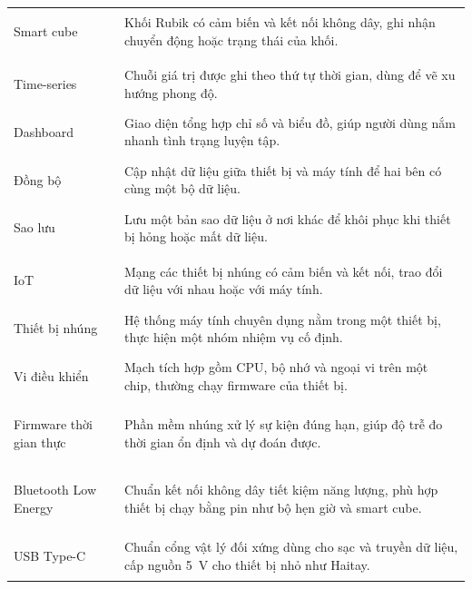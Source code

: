 {\begin{longtable}{>{\bfseries\raggedright\arraybackslash}m{3.8cm} >{\raggedright\arraybackslash}m{11cm}}
        Smart cube & Khối Rubik có cảm biến và kết nối không dây, ghi nhận chuyển động hoặc trạng thái của khối. \\
        \rowcolor{haitayblue!8}
        \multicolumn{2}{l}{\textcolor{haitayblue}{\textbf{Dữ liệu và phần mềm}}} \\
        Time-series & Chuỗi giá trị được ghi theo thứ tự thời gian, dùng để vẽ xu hướng phong độ. \\
        Dashboard & Giao diện tổng hợp chỉ số và biểu đồ, giúp người dùng nắm nhanh tình trạng luyện tập. \\
        Đồng bộ & Cập nhật dữ liệu giữa thiết bị và máy tính để hai bên có cùng một bộ dữ liệu. \\
        Sao lưu & Lưu một bản sao dữ liệu ở nơi khác để khôi phục khi thiết bị hỏng hoặc mất dữ liệu. \\
        \rowcolor{haitayblue!8}
        \multicolumn{2}{l}{\textcolor{haitayblue}{\textbf{IoT và phần cứng}}} \\
        IoT & Mạng các thiết bị nhúng có cảm biến và kết nối, trao đổi dữ liệu với nhau hoặc với máy tính. \\
        Thiết bị nhúng & Hệ thống máy tính chuyên dụng nằm trong một thiết bị, thực hiện một nhóm nhiệm vụ cố định. \\
        Vi điều khiển & Mạch tích hợp gồm CPU, bộ nhớ và ngoại vi trên một chip, thường chạy firmware của thiết bị. \\
        Firmware thời gian thực & Phần mềm nhúng xử lý sự kiện đúng hạn, giúp độ trễ đo thời gian ổn định và dự đoán được. \\
        Bluetooth Low Energy & Chuẩn kết nối không dây tiết kiệm năng lượng, phù hợp thiết bị chạy bằng pin như bộ hẹn giờ và smart cube. \\
        USB Type-C & Chuẩn cổng vật lý đối xứng dùng cho sạc và truyền dữ liệu, cấp nguồn 5~V cho thiết bị nhỏ như Haitay. \\
        \bottomrule
\end{longtable}
}
